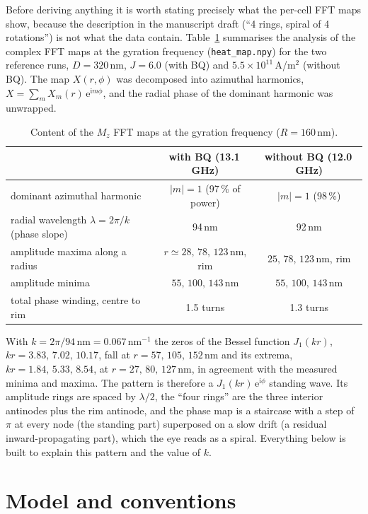 \documentclass[11pt,a4paper]{article}
\newcommand{\ee}{\mathrm{e}}
\newcommand{\ii}{\mathrm{i}}
\begin{document}
Before deriving anything it is worth stating precisely what the per-cell FFT maps show, because the
description in the manuscript draft (``4 rings, spiral of 4 rotations'') is not what the data contain.
Table~\ref{tab:maps} summarises the analysis of the complex FFT maps at the gyration frequency
(\texttt{heat\_map.npy}) for the two reference runs, $D=320$\,nm, $J=6.0$ (with BQ) and $5.5\times10^{11}$\,A/m$^2$
(without BQ).  The map $X(r,\phi)$ was decomposed into azimuthal harmonics,
$X=\sum_m X_m(r)\,\ee^{\ii m\phi}$, and the radial phase of the dominant harmonic was unwrapped.

\begin{table}[h]
\centering
\caption{Content of the $M_z$ FFT maps at the gyration frequency ($R=160$\,nm).}
\label{tab:maps}
\begin{tabular}{lcc}
\toprule
 & with BQ (13.1\,GHz) & without BQ (12.0\,GHz)\\
\midrule
dominant azimuthal harmonic & $|m|=1$ (97\,\% of power) & $|m|=1$ (98\,\%)\\
radial wavelength $\lambda=2\pi/k$ (phase slope) & 94\,nm & 92\,nm\\
amplitude maxima along a radius & $r\simeq28,\,78,\,123$\,nm, rim & $25,\,78,\,123$\,nm, rim\\
amplitude minima & $55,\,100,\,143$\,nm & $55,\,100,\,143$\,nm\\
total phase winding, centre to rim & 1.5 turns & 1.3 turns\\
\bottomrule
\end{tabular}
\end{table}

With $k=2\pi/94\,\mathrm{nm}=0.067\,\mathrm{nm}^{-1}$ the zeros of the Bessel function $J_1(kr)$,
$kr=3.83,\,7.02,\,10.17$, fall at $r=57,\,105,\,152$\,nm and its extrema, $kr=1.84,\,5.33,\,8.54$, at
$r=27,\,80,\,127$\,nm, in agreement with the measured minima and maxima.  The pattern is therefore a
$J_1(kr)\,\ee^{\ii\phi}$ standing wave.  Its amplitude rings are spaced by $\lambda/2$, the ``four rings'' are the
three interior antinodes plus the rim antinode, and the phase map is a staircase with a step of $\pi$ at every
node (the standing part) superposed on a slow drift (a residual inward-propagating part), which the eye reads
as a spiral.  Everything below is built to explain this pattern and the value of $k$.

\section{Model and conventions}
\label{sec:model}
\end{document}
